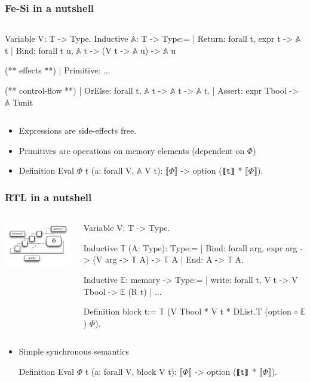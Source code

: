 \documentclass[9pt]{beamer}
\newcommand\denote[1]{\llbracket #1 \rrbracket}
\newcommand\fesi{Fe-Si}
\begin{document}
\begin{frame}[fragile]
  \frametitle{\fesi{} in a nutshell}
  \begin{columns}

\begin{coq}
Variable V: T -> Type. 
Inductive $\mathbb A$: T -> Type:=
| Return: forall t, expr t -> $\mathbb A$ t
| Bind: forall t u,  $\mathbb A$  t -> (V t -> $\mathbb A$ u) -> $\mathbb A$ u

(** effects **)
| Primitive: ... 

(** control-flow **)
| OrElse: forall t, $\mathbb A$ t -> $\mathbb A$ t -> $\mathbb A$ t.
| Assert: expr Tbool -> $\mathbb A$ Tunit\end{coq}
    \end{columns}


\begin{itemize}
\item Expressions are side-effects free. 
\item Primitives are operations on memory elements (dependent on $\Phi$)
\item 
  \begin{coq}
Definition Eval $\Phi$ t (a: forall V, $\mathbb A$ V t): $\denote\Phi$ -> option ($\denote{\tt t}$ * $\denote\Phi$).
\end{coq}
\end{itemize}

\end{frame}
\begin{frame}[fragile]
  \frametitle{RTL in a nutshell}
  \begin{columns}
\includegraphics[width=5cm]{figs/rtl.pdf}
    
    \begin{coq}
Variable V: T -> Type.       

Inductive $\mathbb T$ (A: Type): Type:=
| Bind: forall arg, expr arg -> (V arg -> $\mathbb T$ A) -> $\mathbb T$ A
| End: A -> $\mathbb T$ A.

Inductive $\mathbb E$: memory -> Type:=
| write: forall t,  V t -> V Tbool -> $\mathbb E$ (R t)
| ...

Definition block t:=
  $\mathbb T$ (V Tbool  * V t  * DList.T (option $\circ$ $\mathbb E$) $\Phi$). 
\end{coq}
  \end{columns}


\begin{itemize}
\item Simple synchronous semantics 
  \begin{coq}
Definition Eval $\Phi$ t (a: forall V, block V t): $\denote\Phi$ -> option ($\denote{\tt t}$ * $\denote\Phi$).
\end{coq}
\end{itemize} 
\end{frame}
\end{document}
